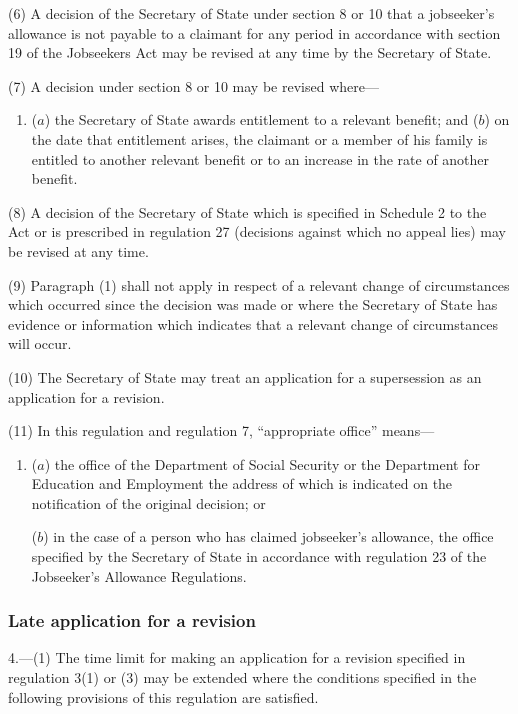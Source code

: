 \documentclass[12pt,a4paper]{article}
\begin{document}
(6) A decision of the Secretary of State under section 8 or 10 that a jobseeker’s allowance is not payable to a claimant for any period in accordance with section 19 of the Jobseekers Act may be revised at any time by the Secretary of State.

(7) A decision under section 8 or 10 may be revised where—
\begin{enumerate}\item[]
($a$) the Secretary of State awards entitlement to a relevant benefit; and
($b$) on the date that entitlement arises, the claimant or a member of his family is entitled to another relevant benefit or to an increase in the rate of another benefit.
\end{enumerate}

(8) A decision of the Secretary of State which is specified in Schedule 2 to the Act or is prescribed in regulation 27 (decisions against which no appeal lies) may be revised at any time.

(9) Paragraph (1) shall not apply in respect of a relevant change of circumstances which occurred since the decision was made or where the Secretary of State has evidence or information which indicates that a relevant change of circumstances will occur.

(10) The Secretary of State may treat an application for a supersession as an application for a revision.

(11) In this regulation and regulation 7, “appropriate office” means---
\begin{enumerate}\item[]
($a$) the office of the Department of Social Security or the Department for Education and Employment the address of which is indicated on the notification of the original decision; or

($b$) in the case of a person who has claimed jobseeker’s allowance, the office specified by the Secretary of State in accordance with regulation 23 of the Jobseeker’s Allowance Regulations.
\end{enumerate}

\subsubsection[4. Late application for a revision]{Late application for a revision}

4.—(1) The time limit for making an application for a revision specified in regulation 3(1) or (3) may be extended where the conditions specified in the following provisions of this regulation are satisfied.
\end{document}
